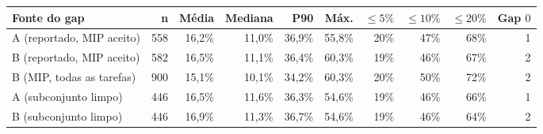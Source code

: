\begin{tabular}{lrrrrrrrrr}
\toprule
Fonte do gap & n & Média & Mediana & P90 & Máx. & $\le 5\%$ & $\le 10\%$ & $\le 20\%$ & Gap $0$ \\
\midrule
A (reportado, MIP aceito) & 558 & 16,2\% & 11,0\% & 36,9\% & 55,8\% & 20\% & 47\% & 68\% & 1 \\
B (reportado, MIP aceito) & 582 & 16,5\% & 11,1\% & 36,4\% & 60,3\% & 19\% & 46\% & 67\% & 2 \\
B (MIP, todas as tarefas) & 900 & 15,1\% & 10,1\% & 34,2\% & 60,3\% & 20\% & 50\% & 72\% & 2 \\
A (subconjunto limpo) & 446 & 16,5\% & 11,6\% & 36,3\% & 54,6\% & 19\% & 46\% & 66\% & 1 \\
B (subconjunto limpo) & 446 & 16,9\% & 11,3\% & 36,7\% & 54,6\% & 19\% & 46\% & 64\% & 2 \\
\bottomrule
\end{tabular}
